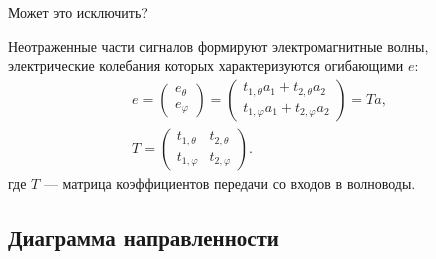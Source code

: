         {
    \color{red}
    Может это исключить?

    Неотраженные части сигналов формируют электромагнитные волны, электрические колебания которых характеризуются огибающими $e$:
    \begin{gather*}
        e
        = \begin{pmatrix}
              e_\theta \\
              e_\varphi
        \end{pmatrix}
        = \begin{pmatrix}
              t_{1, \theta} a_1 + t_{2, \theta} a_2 \\
              t_{1, \varphi} a_1 + t_{2, \varphi} a_2
        \end{pmatrix}
        = T a, \\
        T
        = \begin{pmatrix}
              t_{1, \theta}  & t_{2, \theta}  \\
              t_{1, \varphi} & t_{2, \varphi}
        \end{pmatrix} .
    \end{gather*}
    где $T$ --- матрица коэффициентов передачи со входов в волноводы.
}

\subsection{Диаграмма направленности}

